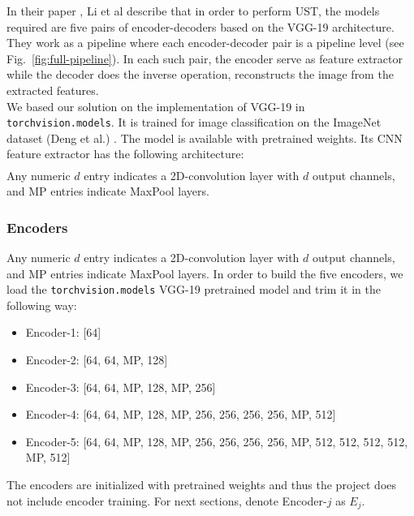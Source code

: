 \hspace{0.5cm} In their paper \cite{bib11}, Li et al describe that in order to perform UST, the models required are five pairs of encoder-decoders based on the VGG-19 architecture. They work as a pipeline where each encoder-decoder pair is a pipeline level (see Fig.~\ref{fig:full-pipeline}). In each such pair, the encoder serve as feature extractor while the decoder does the inverse operation, reconstructs the image from the extracted features.\\
We based our solution on the implementation of VGG-19 \cite{bib20} in \texttt{torchvision.models}. It is trained for image classification on the ImageNet dataset (Deng et al.) \cite{bib21}. The model is available with pretrained weights. Its CNN feature extractor has the following architecture:
\begin{gather*}
[64, 64, MP, 128, 128, MP, 256, 256, 256, 256, MP, 512, 512, 512, 512, MP, 512, 512, 512, 512, MP]
\end{gather*}
Any numeric $d$ entry indicates a 2D-convolution layer with $d$ output channels, and MP entries indicate MaxPool layers.

\subsubsection{Encoders}\label{subsec:Encoders}
Any numeric $d$ entry indicates a 2D-convolution layer with $d$ output channels, and MP entries indicate MaxPool layers. In order to build the five encoders, we load the \texttt{torchvision.models} VGG-19 pretrained model and trim it in the following way:
\begin{itemize}
	\item Encoder-1: [64]
	\item Encoder-2: [64, 64, MP, 128]
	\item Encoder-3: [64, 64, MP, 128, MP, 256]
	\item Encoder-4: [64, 64, MP, 128, MP, 256, 256, 256, 256, MP, 512]
	\item Encoder-5: [64, 64, MP, 128, MP, 256, 256, 256, 256, MP, 512, 512, 512, 512, MP, 512]
\end{itemize}
The encoders are initialized with pretrained weights and thus the project does not include encoder training. For next sections, denote Encoder-$j$ as $E_j$.

